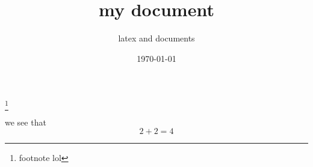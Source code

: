 \documentclass[12pt]{article}
\title{my document}
\subtitle{latex and documents}
\date{\today}
\begin{document}
\maketitlepage
\maketitlestart
\blindtext[2]
\footnote{footnote lol}
\begin{qsolve}[My conclusion]
	we see that $$2+2=4$$
\end{qsolve}
\vfil
\begin{conclusion}
	\blindtext
\end{conclusion}
\clearpage
\blinddocument
\end{document}
